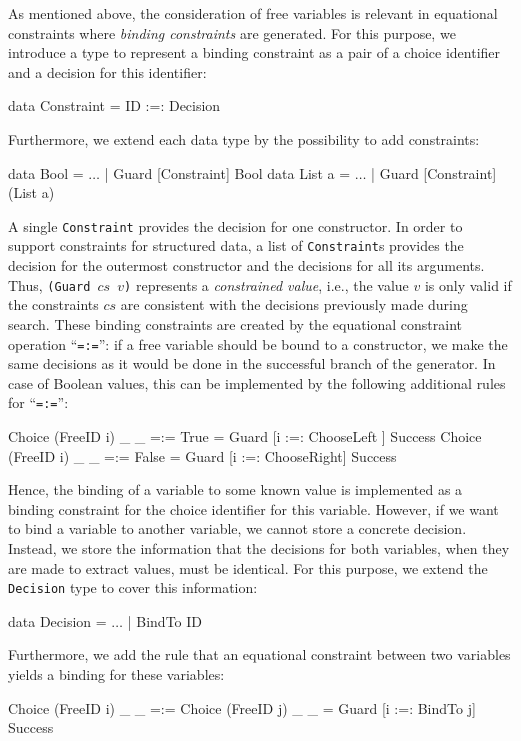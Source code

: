 \documentclass{llncs}
\newcommand{\code}[1]{\mbox{\small\texttt{#1}}}
\newcommand{\ccode}[1]{``\code{#1}''}
\begin{document}
As mentioned above, the consideration of free variables
is relevant in equational constraints where \emph{binding constraints} are
generated. For this purpose, we introduce a type to represent
a binding constraint as a pair of a choice identifier
and a decision for this identifier:
\begin{haskell}
  data Constraint = ID :=: Decision
\end{haskell}
Furthermore, we extend each data type by the possibility to
add constraints:
\begin{haskell}
  data Bool   = $\ldots$ | Guard [Constraint] Bool
  data List a = $\ldots$ | Guard [Constraint] (List a)
\end{haskell}
A single \code{Constraint} provides the decision for
one constructor. In order to support constraints for structured data,
a list of \code{Constraint}s provides the decision for the outermost
constructor and the decisions for all its arguments.
Thus, \code{(Guard $cs$ $v$)} represents a \emph{constrained value},
i.e., the value $v$ is only valid if the constraints $cs$ are
consistent with the decisions previously made during search.
These binding constraints are created by the
equational constraint operation \ccode{=:=}: if a free variable
should be bound to a constructor, we make the same
decisions as it would be done in the successful branch
of the generator. In case of Boolean values,
this can be implemented by the following additional rules
for \ccode{=:=}:
\begin{haskell}
  Choice (FreeID i) _ _ =:= True   =  Guard [i :=: ChooseLeft ] Success
  Choice (FreeID i) _ _ =:= False  =  Guard [i :=: ChooseRight] Success
\end{haskell}
Hence, the binding of a variable to some known value
is implemented as a binding constraint for the choice identifier
for this variable. However, if we want to bind a variable
to another variable, we cannot store a concrete decision.
Instead, we store the information that the decisions for
both variables, when they are made to extract values,
must be identical. For this purpose, we extend the \code{Decision}
type to cover this information:
\begin{haskell}
  data Decision = $\ldots$ | BindTo ID
\end{haskell}
Furthermore, we add the rule that an equational constraint
between two variables yields a binding for these variables:%
\begin{haskell}
  Choice (FreeID i) _ _ =:= Choice (FreeID j) _ _
    =  Guard [i :=: BindTo j] Success
\end{haskell}
\end{document}
